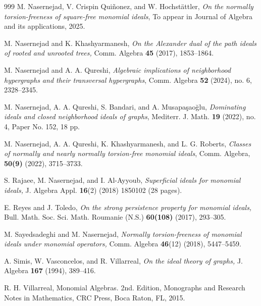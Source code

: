 \documentclass[11pt]{amsart}
\begin{document}
\begin{thebibliography}{999}
 M. Nasernejad,  V. Crispin   Qui\~n{o}nez, and   W. Hochst\"attler, \textit{On the normally torsion-freeness of square-free monomial ideals}, 
To appear in Journal of Algebra and its applications, 2025. 
 

    M. Nasernejad   and K. Khashyarmanesh, {\it On the Alexander dual of the path ideals of rooted and unrooted trees,} Comm. Algebra  
  {\bf 45} (2017), 1853--1864.

 M. Nasernejad and  A. A. Qureshi, {\it  Algebraic implications of neighborhood hypergraphs and their transversal hypergraphs}, 
Comm. Algebra \textbf{52} (2024), no. 6, 2328--2345. 


 M. Nasernejad, A. A. Qureshi, S. Bandari, and A.  Musapa\c{s}ao\u{g}lu, {\it  Dominating ideals and closed neighborhood ideals of graphs}, Mediterr. J. Math. {\bf 19}  (2022), no. 4, Paper No. 152, 18 pp. 

  M. Nasernejad, A. A. Qureshi, K. Khashyarmanesh, and L. G. Roberts,  {\it Classes of normally and nearly normally torsion-free monomial ideals}, Comm. Algebra, {\bf 50(9)} (2022), 3715--3733. 


  S. Rajaee, M. Nasernejad, and  I. Al-Ayyoub, {\it Superficial ideals for monomial ideals,} J. Algebra Appl. {\bf 16}(2)  (2018) 1850102 (28 pages).


    E. Reyes  and J. Toledo, {\it On the strong persistence property for monomial ideals,}  Bull. Math. Soc. Sci. Math. Roumanie (N.S.) 
{\bf 60(108)} (2017),  293--305. 

   M. Sayedsadeghi and M. Nasernejad, {\it Normally torsion-freeness of monomial ideals under monomial operators,}  Comm. Algebra {\bf 46}(12) (2018),  5447--5459.


   A. Simis, W. Vasconcelos, and R. Villarreal,  {\it On the ideal theory of graphs,} J. Algebra {\bf 167} (1994),  389--416.


  R. H. Villarreal, {Monomial Algebras.} 2nd. Edition, Monographs and Research Notes in Mathematics, CRC Press, Boca Raton, FL, 2015.
 

 \end{thebibliography}
 
 

\end{document}
